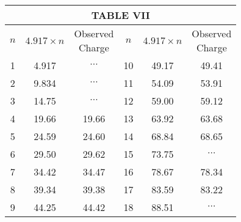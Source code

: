 \documentclass{article}
\begin{document}
\begin{center}
\begin{tabular}{c|c|c||c|c|c}
\multicolumn{6}{c}{TABLE VII}\\[3pt]
\hline
\hline
\rule{0pt}{1.5\normalbaselineskip}
$n$ & $4.917\!\times\!{n}$ & \makecell{\small{Observed}\\\small{Charge}} & $n$ & $4.917\!\times\!{n}$ & \makecell{\small{Observed}\\\small{Charge}}\\[8pt]
\hline
\rule{0pt}{1\normalbaselineskip}
1 & 4.917 & $\cdots$ & 10 & 49.17 & 49.41\\
2 & 9.834 & $\cdots$ & 11 & 54.09 & 53.91\\
3 & 14.75 & $\cdots$ & 12 & 59.00 & 59.12\\
4 & 19.66 & 19.66  & 13 & 63.92 & 63.68\\
5 & 24.59 & 24.60  & 14 & 68.84 & 68.65\\
6 & 29.50 & 29.62  & 15 & 73.75 & $\cdots$\\
7 & 34.42 & 34.47  & 16 & 78.67 & 78.34\\
8 & 39.34 & 39.38  & 17 & 83.59 & 83.22\\
9 & 44.25 & 44.42  & 18 & 88.51 & $\cdots$\\[3pt]
\hline
\end{tabular}
\end{center}

\bigskip
\end{document}
